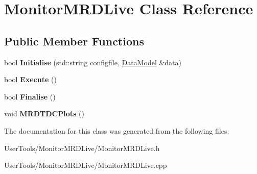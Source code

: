 \hypertarget{classMonitorMRDLive}{
\section{MonitorMRDLive Class Reference}
\label{classMonitorMRDLive}
}
\subsection*{Public Member Functions}
\begin{DoxyCompactItemize}
\item 
\hypertarget{classMonitorMRDLive_a05a63a84f2a7b6e4340d21e2c018a971}{
bool {\bfseries Initialise} (std::string configfile, \hyperlink{classDataModel}{DataModel} \&data)}
\label{classMonitorMRDLive_a05a63a84f2a7b6e4340d21e2c018a971}

\item 
\hypertarget{classMonitorMRDLive_a86c7648cc8aad1fb24d86d7f13507128}{
bool {\bfseries Execute} ()}
\label{classMonitorMRDLive_a86c7648cc8aad1fb24d86d7f13507128}

\item 
\hypertarget{classMonitorMRDLive_ae061bd82e645e7cd1d383badee568d49}{
bool {\bfseries Finalise} ()}
\label{classMonitorMRDLive_ae061bd82e645e7cd1d383badee568d49}

\item 
\hypertarget{classMonitorMRDLive_a74930d4f7ddc5ff78db48551aa9d6f99}{
void {\bfseries MRDTDCPlots} ()}
\label{classMonitorMRDLive_a74930d4f7ddc5ff78db48551aa9d6f99}

\end{DoxyCompactItemize}


The documentation for this class was generated from the following files:\begin{DoxyCompactItemize}
\item 
UserTools/MonitorMRDLive/MonitorMRDLive.h\item 
UserTools/MonitorMRDLive/MonitorMRDLive.cpp\end{DoxyCompactItemize}
